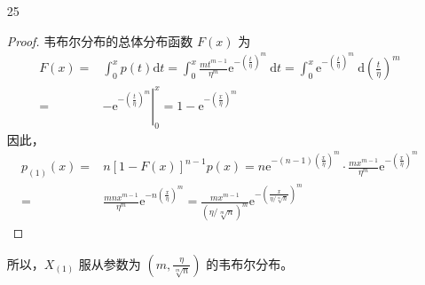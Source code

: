 \documentclass[normal,founder,mtpro2,cn]{elegantnote}
\begin{document}
\begin{enumerate}
\begin{proof}
            对于 $X_{(1)}$，有
            \begin{equation*}
                \begin{aligned}
                    P\left(X_{(1)}=k\right)=&P\left(X_{(1)}\leq k\right)-P\left(X_{(1)}\leq k-1\right) \\
                    =&1-P\left(X_{(1)}>k\right)-\left[1-P\left(X_{(1)}>k-1\right)\right]\\
                    =&\prod_{i=1}^{n}P\left(X_{i}>k-1\right)-\prod_{i=1}^{n}P\left(X_{i}>k\right) \\
                    =&q^{n(k-1)}-q^{n k}=q^{n(k-1)}\left(1-q^n\right)
                \end{aligned}
            \end{equation*}
        \end{proof}

        \item[25]
        \begin{proof}
            韦布尔分布的总体分布函数 $F(x)$ 为
            \begin{equation*}
                \begin{aligned}
                    F(x)=&\int_{0}^{x} p(t) \mathrm{d} t=\int_{0}^{x} \frac{m t^{m-1}}{\eta^{m}} \mathrm{e}^{-\left(\frac{t}{\eta}\right)^{m}} \mathrm{~d} t=\int_{0}^{x} \mathrm{e}^{-\left(\frac{t}{\eta}\right)^{m}} \mathrm{~d}\left(\frac{t}{\eta}\right)^{m} \\
                    =&-\left.\mathrm{e}^{-\left(\frac{t}{\eta}\right)^{m}}\right|_{0} ^{x}=1-\mathrm{e}^{-\left(\frac{x}{\eta}\right)^{m}}
                \end{aligned}
            \end{equation*}
            因此，
            \begin{equation*}
                \begin{aligned}
                    p_{(1)}(x)=&n[1-F(x)]^{n-1} p(x)=n \mathrm{e}^{-(n-1)\left(\frac{x}{\eta}\right)^{m}} \cdot \frac{m x^{m-1}}{\eta^{m}} \mathrm{e}^{-\left(\frac{x}{\eta}\right)^{m}} \\
                    =&\frac{m n x^{m-1}}{\eta^{m}} \mathrm{e}^{-n\left(\frac{x}{\eta}\right)^{m}}
                    =\frac{m x^{m-1}}{(\eta / \sqrt[m]{n})^{m}} \mathrm{e}^{-\left(\frac{x}{\eta / \sqrt[m]{n}}\right)^{m}}
                \end{aligned}
            \end{equation*}
        \end{proof}
        所以，$X_{(1)}$ 服从参数为 $\left(m,\frac{\eta}{\sqrt[m]{n}}\right)$ 的韦布尔分布。
    \end{enumerate}
\end{document}
